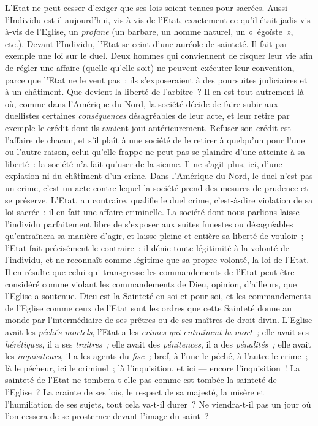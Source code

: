 \documentclass[french,twoside]{book} %
\begin{document}
L’Etat ne peut cesser d’exiger que ses lois soient tenues pour sacrées. Aussi l’Individu est-il aujourd’hui, vis-à-vis de l’Etat, exactement ce qu’il était jadis vis-à-vis de l’Eglise, un \emph{profane} (un barbare, un homme naturel, un « égoïste », etc.). Devant l’Individu, l’Etat se ceint d’une auréole de sainteté. Il fait par exemple une loi sur le duel. Deux hommes qui conviennent de risquer leur vie afin de régler une affaire (quelle qu’elle soit) ne peuvent exécuter leur convention, parce que l’Etat ne le veut pas : ils s’exposeraient à des poursuites judiciaires et à un châtiment. Que devient la liberté de l’arbitre ? Il en est tout autrement là où, comme dans l’Amérique du Nord, la société décide de faire subir aux duellistes certaines \emph{conséquences} désagréables de leur acte, et leur retire par exemple le crédit dont ils avaient joui antérieurement. Refuser son crédit est l’affaire de chacun, et s’il plaît à une société de le retirer à quelqu’un pour l’une ou l’autre raison, celui qu’elle frappe ne peut pas se plaindre d’une atteinte à sa liberté : la société n’a fait qu’user de la sienne. Il ne s’agit plus, ici, d’une expiation ni du châtiment d’un crime. Dans l’Amérique du Nord, le duel n’est pas un crime, c’est un acte contre lequel la société prend des mesures de prudence et se préserve. L’Etat, au contraire, qualifie le duel crime, c’est-à-dire violation de sa loi sacrée : il en fait une affaire criminelle. La société dont nous parlions laisse l’individu parfaitement libre de s’exposer aux suites funestes ou désagréables qu’entraînera sa manière d’agir, et laisse pleine et entière sa liberté de vouloir ; l’Etat fait précisément le contraire : il dénie toute légitimité à la volonté de l’individu, et ne reconnaît comme légitime que sa propre volonté, la loi de l’Etat. Il en résulte que celui  qui transgresse les commandements de l’Etat peut être considéré comme violant les commandements de Dieu, opinion, d’ailleurs, que l’Eglise a soutenue. Dieu est la Sainteté en soi et pour soi, et les commandements de l’Eglise comme ceux de l’Etat sont les ordres que cette Sainteté donne au monde par l’intermédiaire de ses prêtres ou de ses maîtres de droit divin. L’Eglise avait les \emph{péchés mortels}, l’Etat a les \emph{crimes qui entraînent la mort ;} elle avait ses \emph{hérétiques,} il a ses \emph{traîtres ;} elle avait des \emph{pénitences}, il a des \emph{pénalités ;} elle avait les \emph{inquisiteurs}, il a les agents du \emph{fisc ;} bref, à l’une le péché, à l’autre le crime ; là le pécheur, ici le criminel ; là l’inquisition, et ici — encore l’inquisition ! La sainteté de l’Etat ne tombera-t-elle pas comme est tombée la sainteté de l’Eglise ? La crainte de ses lois, le respect de sa majesté, la misère et l’humiliation de ses sujets, tout cela va-t-il durer ? Ne viendra-t-il pas un jour où l’on cessera de se prosterner devant l’image du saint ?\par
\end{document}
